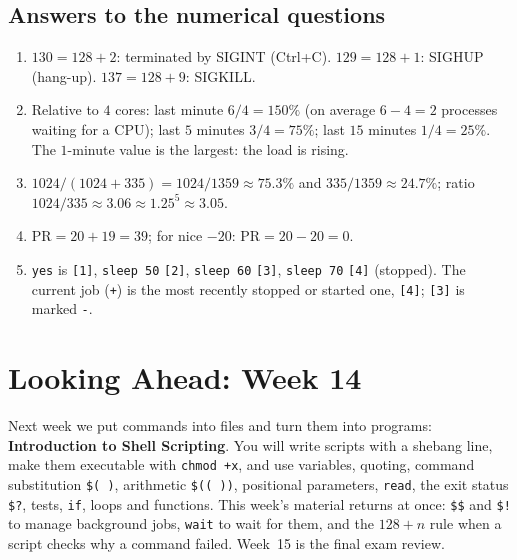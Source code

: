 \documentclass[11pt,a4paper]{article}
\newcommand{\cmd}[1]{\texttt{#1}}
\begin{document}
\subsection*{Answers to the numerical questions}
\begin{enumerate}[leftmargin=1.6em,start=7]
  \item $130 = 128 + 2$: terminated by SIGINT (Ctrl+C). $129 = 128 + 1$: SIGHUP (hang-up). $137 = 128 + 9$: SIGKILL.
  \item Relative to $4$ cores: last minute $6/4 = 150\%$ (on average $6 - 4 = 2$ processes waiting for a CPU); last $5$ minutes $3/4 = 75\%$; last $15$ minutes $1/4 = 25\%$. The $1$-minute value is the largest: the load is rising.
  \item $1024/(1024 + 335) = 1024/1359 \approx 75.3\%$ and $335/1359 \approx 24.7\%$; ratio $1024/335 \approx 3.06 \approx 1.25^{5} \approx 3.05$.
  \item $\text{PR} = 20 + 19 = 39$; for nice $-20$: $\text{PR} = 20 - 20 = 0$.
  \item \cmd{yes} is \texttt{[1]}, \cmd{sleep 50} \texttt{[2]}, \cmd{sleep 60} \texttt{[3]}, \cmd{sleep 70} \texttt{[4]} (stopped). The current job (\texttt{+}) is the most recently stopped or started one, \texttt{[4]}; \texttt{[3]} is marked \texttt{-}.
\end{enumerate}

\section{Looking Ahead: Week 14}

Next week we put commands into files and turn them into programs: \textbf{Introduction to Shell Scripting}. You will write scripts with a shebang line, make them executable with \cmd{chmod +x}, and use variables, quoting, command substitution \verb|$( )|, arithmetic \verb|$(( ))|, positional parameters, \cmd{read}, the exit status \verb|$?|, tests, \texttt{if}, loops and functions. This week's material returns at once: \verb|$$| and \verb|$!| to manage background jobs, \cmd{wait} to wait for them, and the $128 + n$ rule when a script checks why a command failed. Week~15 is the final exam review.
\end{document}
